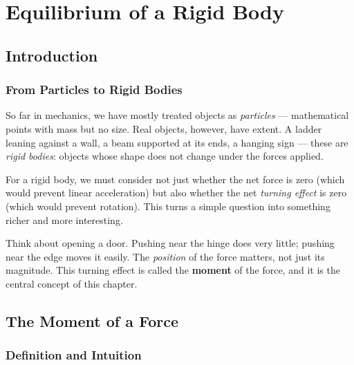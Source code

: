 \documentclass[12pt, a4paper]{book}
\begin{document}
\chapter{Equilibrium of a Rigid Body}

\section{Introduction}

\subsection{From Particles to Rigid Bodies}

So far in mechanics, we have mostly treated objects as \emph{particles} --- mathematical points with mass but no size. Real objects, however, have extent. A ladder leaning against a wall, a beam supported at its ends, a hanging sign --- these are \emph{rigid bodies}: objects whose shape does not change under the forces applied.

For a rigid body, we must consider not just whether the net force is zero (which would prevent linear acceleration) but also whether the net \emph{turning effect} is zero (which would prevent rotation). This turns a simple question into something richer and more interesting.

\begin{intuitionbox}
Think about opening a door. Pushing near the hinge does very little; pushing near the edge moves it easily. The \emph{position} of the force matters, not just its magnitude. This turning effect is called the \textbf{moment} of the force, and it is the central concept of this chapter.
\end{intuitionbox}

\section{The Moment of a Force}

\subsection{Definition and Intuition}
\end{document}

